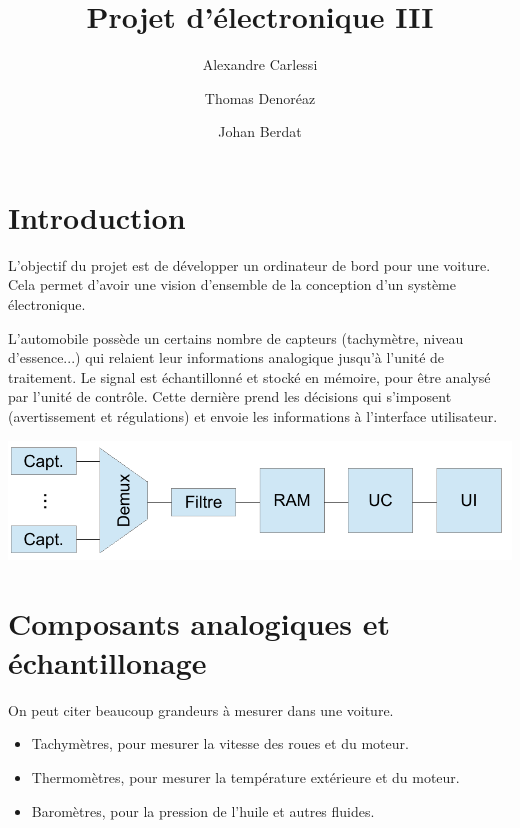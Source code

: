 \documentclass[a4paper]{article} %
\begin{document}
\title{Projet d'électronique III}
\author{Alexandre Carlessi \and Thomas Denoréaz \and Johan Berdat}

\maketitle

\tableofcontents

\section{Introduction}

L'objectif du projet est de développer un ordinateur de bord pour une voiture.
Cela permet d'avoir une vision d'ensemble de la conception d'un système électronique.

L'automobile possède un certains nombre de capteurs (tachymètre, niveau d'essence...) qui relaient leur informations analogique jusqu'à l'unité de traitement.
Le signal est échantillonné et stocké en mémoire, pour être analysé par l'unité de contrôle.
Cette dernière prend les décisions qui s'imposent (avertissement et régulations) et envoie les informations à l'interface utilisateur.

\begin{center}
\includegraphics[scale=0.6]{global.pdf}
\end{center}


\section{Composants analogiques et échantillonage}

On peut citer beaucoup grandeurs à mesurer dans une voiture.
\begin{itemize}
\item
	Tachymètres, pour mesurer la vitesse des roues et du moteur.
\item
	Thermomètres, pour mesurer la température extérieure et du moteur.
\item
	Baromètres, pour la pression de l'huile et autres fluides.
\end{itemize}
\end{document}
